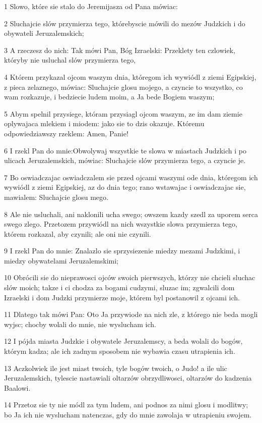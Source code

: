 \par 1 Slowo, które sie stalo do Jeremijasza od Pana mówiac:
\par 2 Sluchajcie slów przymierza tego, którebyscie mówili do mezów Judzkich i do obywateli Jeruzalemskich;
\par 3 A rzeczesz do nich: Tak mówi Pan, Bóg Izraelski: Przeklety ten czlowiek, któryby nie usluchal slów przymierza tego,
\par 4 Którem przykazal ojcom waszym dnia, któregom ich wywiódl z ziemi Egipskiej, z pieca zelaznego, mówiac: Sluchajcie glosu mojego, a czyncie to wszystko, co wam rozkazuje, i bedziecie ludem moim, a Ja bede Bogiem waszym;
\par 5 Abym spelnil przysiege, któram przysiagl ojcom waszym, ze im dam ziemie oplywajaca mlekiem i miodem: jako sie to dzis okazuje. Któremu odpowiedziawszy rzeklem: Amen, Panie!
\par 6 I rzekl Pan do mnie:Obwolywaj wszystkie te slowa w miastach Judzkich i po ulicach Jeruzalemskich, mówiac: Sluchajcie slów przymierza tego, a czyncie je.
\par 7 Bo oswiadczajac oswiadczalem sie przed ojcami waszymi ode dnia, któregom ich wywiódl z ziemi Egipskiej, az do dnia tego; rano wstawajac i oswiadczajac sie, mawialem: Sluchajcie glosu mego.
\par 8 Ale nie usluchali, ani naklonili ucha swego; owszem kazdy szedl za uporem serca swego zlego. Przetozem przywiódl na nich wszystkie slowa przymierza tego, którem rozkazal, aby czynili; ale oni nie czynili.
\par 9 I rzekl Pan do mnie: Znalazlo sie sprzysiezenie miedzy mezami Judzkimi, i miedzy obywatelami Jeruzalemskimi;
\par 10 Obrócili sie do nieprawosci ojców swoich pierwszych, którzy nie chcieli sluchac slów moich; takze i ci chodza za bogami cudzymi, sluzac im; zgwalcili dom Izraelski i dom Judzki przymierze moje, którem byl postanowil z ojcami ich.
\par 11 Dlatego tak mówi Pan: Oto Ja przywiode na nich zle, z którego nie beda mogli wyjsc; chocby wolali do mnie, nie wyslucham ich.
\par 12 I pójda miasta Judzkie i obywatele Jeruzalemscy, a beda wolali do bogów, którym kadza; ale ich zadnym sposobem nie wybawia czasu utrapienia ich.
\par 13 Aczkolwiek ile jest miast twoich, tyle bogów twoich, o Judo! a ile ulic Jeruzalemskich, tylescie nastawiali oltarzów obrzydliwosci, oltarzów do kadzenia Baalowi.
\par 14 Przetoz sie ty nie módl za tym ludem, ani podnos za nimi glosu i modlitwy; bo Ja ich nie wyslucham natenczas, gdy do mnie zawolaja w utrapieniu swojem.
